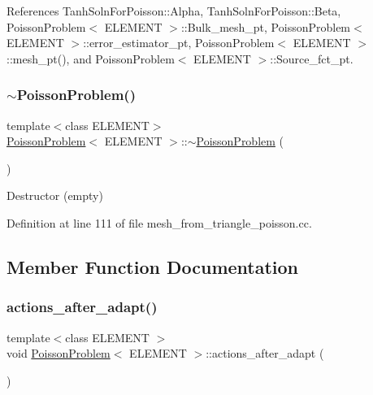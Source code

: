 References Tanh\+Soln\+For\+Poisson\+::\+Alpha, Tanh\+Soln\+For\+Poisson\+::\+Beta, Poisson\+Problem$<$ E\+L\+E\+M\+E\+N\+T $>$\+::\+Bulk\+\_\+mesh\+\_\+pt, Poisson\+Problem$<$ E\+L\+E\+M\+E\+N\+T $>$\+::error\+\_\+estimator\+\_\+pt, Poisson\+Problem$<$ E\+L\+E\+M\+E\+N\+T $>$\+::mesh\+\_\+pt(), and Poisson\+Problem$<$ E\+L\+E\+M\+E\+N\+T $>$\+::\+Source\+\_\+fct\+\_\+pt.

\mbox{\label{classPoissonProblem_ac247e42d2d292200617f4b9db7ed1ab8}} 
\subsubsection{\texorpdfstring{$\sim$\+Poisson\+Problem()}{~PoissonProblem()}}
{\footnotesize\ttfamily template$<$class E\+L\+E\+M\+E\+NT$>$ \\
\hyperlink{classPoissonProblem}{Poisson\+Problem}$<$ E\+L\+E\+M\+E\+NT $>$\+::$\sim$\hyperlink{classPoissonProblem}{Poisson\+Problem} (\begin{DoxyParamCaption}{ }\end{DoxyParamCaption})\hspace{0.3cm}{\ttfamily [inline]}}



Destructor (empty) 



Definition at line 111 of file mesh\+\_\+from\+\_\+triangle\+\_\+poisson.\+cc.



\subsection{Member Function Documentation}
\mbox{\label{classPoissonProblem_ada7322b2e49e240033a2c3c974ddf0ca}} 
\subsubsection{\texorpdfstring{actions\+\_\+after\+\_\+adapt()}{actions\_after\_adapt()}}
{\footnotesize\ttfamily template$<$class E\+L\+E\+M\+E\+NT $>$ \\
void \hyperlink{classPoissonProblem}{Poisson\+Problem}$<$ E\+L\+E\+M\+E\+NT $>$\+::actions\+\_\+after\+\_\+adapt (\begin{DoxyParamCaption}{ }\end{DoxyParamCaption})}



